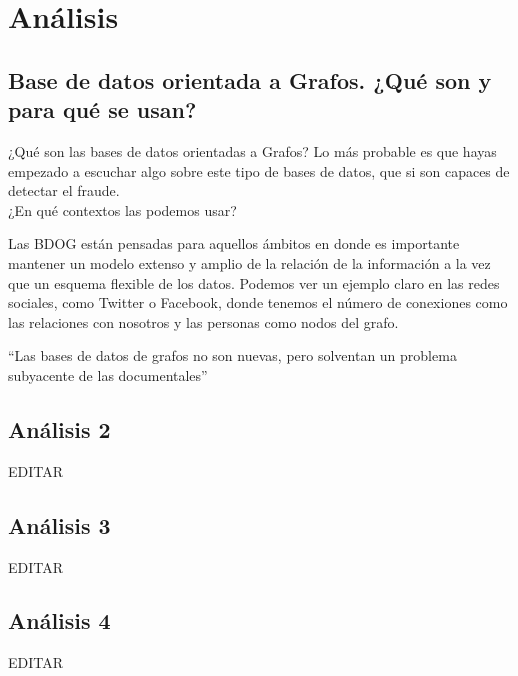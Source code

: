\documentclass[preprint,12pt]{elsarticle}
\begin{document}
 



\section{Análisis}

\subsection{\textbf{Base de datos orientada a Grafos. ¿Qué son y para qué se usan?}}
¿Qué son las bases de datos orientadas a Grafos? Lo más probable es que hayas empezado a escuchar algo sobre este tipo de bases de datos, que si son capaces de detectar el fraude.\\

¿En qué contextos las podemos usar?

Las BDOG están pensadas para aquellos ámbitos en donde es importante mantener un modelo extenso y amplio de la relación de la información a la vez que un esquema flexible de los datos. Podemos ver un ejemplo claro en las redes sociales, como Twitter o Facebook, donde tenemos el número de conexiones como las relaciones con nosotros y las personas como nodos del grafo.

“Las bases de datos de grafos no son nuevas, pero solventan un problema subyacente de las documentales”



\subsection{\textbf{Análisis 2}}
EDITAR\\

\subsection{\textbf{Análisis 3}}
EDITAR\\

\subsection{\textbf{Análisis 4}}
EDITAR\\
\end{document}
